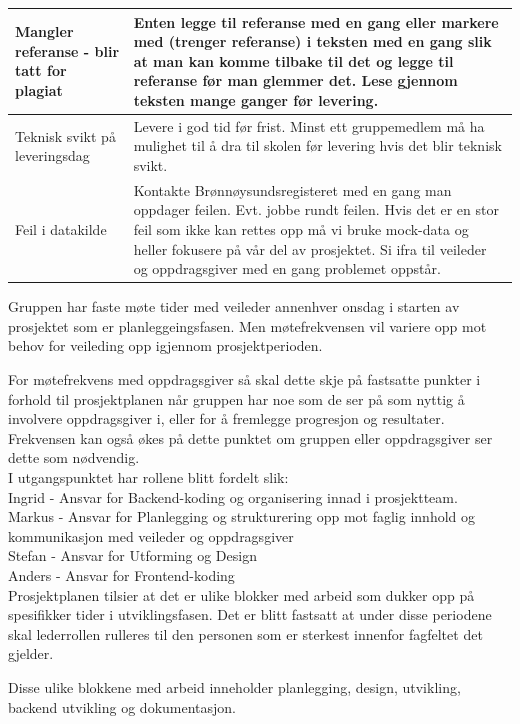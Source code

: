\documentclass[11pt,a4paper]{report}
\begin{document}
\begin{center}
\begin{longtable}{ |m{6cm}|m{7cm}| }
 \hline
 Mangler referanse - blir tatt for plagiat & Enten legge til referanse med en gang eller markere med (trenger referanse) i teksten med en gang slik at man kan komme tilbake til det og legge til referanse før man glemmer det. Lese gjennom teksten mange ganger før levering. \\ 
 \hline
 Teknisk svikt på leveringsdag & Levere i god tid før frist. Minst ett gruppemedlem må ha mulighet til å dra til skolen før levering hvis det blir teknisk svikt. \\ 
 \hline
 Feil i datakilde & Kontakte Brønnøysundsregisteret med en gang man oppdager feilen. Evt. jobbe rundt feilen. Hvis det er en stor feil som ikke kan rettes opp må vi bruke mock-data og heller fokusere på vår del av prosjektet. Si ifra til veileder og oppdragsgiver med en gang problemet oppstår. \\ 
 \hline
\end{longtable}
\end{center}


Gruppen har faste møte tider med veileder annenhver onsdag i starten av prosjektet som er planleggeingsfasen. Men møtefrekvensen vil variere opp mot behov for veileding opp igjennom prosjektperioden.

For møtefrekvens med oppdragsgiver så skal dette skje på fastsatte punkter i forhold til prosjektplanen når gruppen har noe som de ser på som nyttig å involvere oppdragsgiver i, eller for å fremlegge progresjon og resultater. Frekvensen kan også økes på dette punktet om gruppen eller oppdragsgiver ser dette som nødvendig.\\

I utgangspunktet har rollene blitt fordelt slik:\\
Ingrid - Ansvar for Backend-koding og organisering innad i prosjektteam.\\
Markus - Ansvar for Planlegging og strukturering opp mot faglig innhold og kommunikasjon med veileder og oppdragsgiver\\
Stefan - Ansvar for Utforming og Design\\
Anders - Ansvar for Frontend-koding\\

Prosjektplanen tilsier at det er ulike blokker med arbeid som dukker opp på spesifikker tider i utviklingsfasen. Det er blitt fastsatt at under disse periodene skal lederrollen rulleres til den personen som er sterkest innenfor fagfeltet det gjelder.

Disse ulike blokkene med arbeid inneholder planlegging, design, utvikling, backend utvikling og dokumentasjon.
\end{document}
